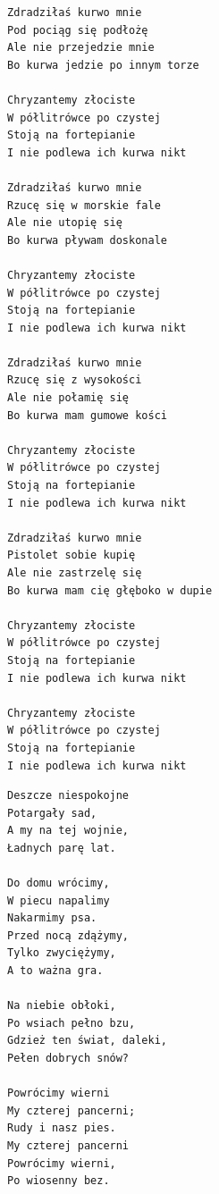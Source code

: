 \documentclass[12pt]{article}
\begin{document}
\begin{verbatim}
Zdradziłaś kurwo mnie
Pod pociąg się podłożę
Ale nie przejedzie mnie
Bo kurwa jedzie po innym torze

Chryzantemy złociste
W półlitrówce po czystej
Stoją na fortepianie
I nie podlewa ich kurwa nikt

Zdradziłaś kurwo mnie
Rzucę się w morskie fale
Ale nie utopię się
Bo kurwa pływam doskonale

Chryzantemy złociste
W półlitrówce po czystej
Stoją na fortepianie
I nie podlewa ich kurwa nikt

Zdradziłaś kurwo mnie
Rzucę się z wysokości
Ale nie połamię się
Bo kurwa mam gumowe kości

Chryzantemy złociste
W półlitrówce po czystej
Stoją na fortepianie
I nie podlewa ich kurwa nikt

Zdradziłaś kurwo mnie
Pistolet sobie kupię
Ale nie zastrzelę się
Bo kurwa mam cię głęboko w dupie

Chryzantemy złociste
W półlitrówce po czystej
Stoją na fortepianie
I nie podlewa ich kurwa nikt

Chryzantemy złociste
W półlitrówce po czystej
Stoją na fortepianie
I nie podlewa ich kurwa nikt
\end{verbatim}
\clearpage

\begin{verbatim}
Deszcze niespokojne
Potargały sad,
A my na tej wojnie,
Ładnych parę lat.

Do domu wrócimy,
W piecu napalimy
Nakarmimy psa.
Przed nocą zdążymy,
Tylko zwyciężymy,
A to ważna gra.

Na niebie obłoki,
Po wsiach pełno bzu,
Gdzież ten świat, daleki,
Pełen dobrych snów?

Powrócimy wierni
My czterej pancerni;
Rudy i nasz pies.
My czterej pancerni
Powrócimy wierni,
Po wiosenny bez.
\end{verbatim}
\clearpage
\end{document}
